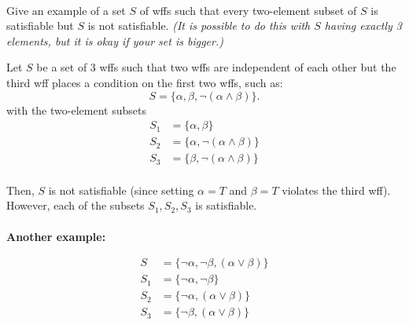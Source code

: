 \documentclass[english, 11pt]{amsart}
\begin{document}
\newpage
{}\\
  \begin{problem}
    Give an example of a set $S$ of wffs such that
    every two-element subset of $S$ is satisfiable
    but $S$ is not satisfiable.
    \emph{
      (It is possible to do this with $S$ having exactly 3 elements,
      but it is okay if your set is bigger.)}
  \end{problem}
  \begin{Answer}
    Let $S$ be a set of $3$ wffs such that two wffs are independent of each other
    but the third wff places a condition on the first two wffs,
    such as:
    \[S = \{ \alpha, \beta, \lnot(\alpha \land \beta)\}.\]
    with the two-element subsets
    \begin{align*}
      S_1 &= \{ \alpha, \beta \} \\
      S_2 &= \{ \alpha, \lnot(\alpha \land \beta) \} \\
      S_3 &= \{ \beta, \lnot(\alpha \land \beta) \}
    \end{align*}
    \\
    Then, $S$ is not satisfiable
    (since setting $\alpha = T$ and $\beta = T$ violates the third wff).\\
    However, each of the subsets $S_1, S_2, S_3$ is satisfiable.
    \\\\
    \textbf{Another example:}

    \begin{align*}
      S &= \{ \lnot \alpha, \lnot \beta, (\alpha \lor \beta)\} \\
      S_1 &= \{ \lnot \alpha, \lnot \beta \} \\
      S_2 &= \{ \lnot \alpha, (\alpha \lor \beta) \} \\
      S_3 &= \{ \lnot \beta, (\alpha \lor \beta) \}  \\
    \end{align*}
  \end{Answer}
\bigskip
\end{document}
